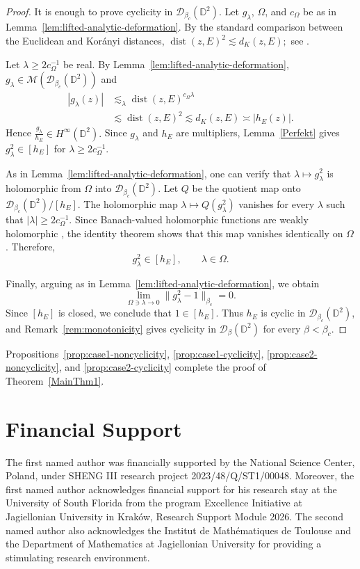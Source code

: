 \documentclass[a4paper,12pt]{amsart}
\theoremstyle{definition}
\begin{document}
\begin{proof}
It is enough to prove cyclicity in $\mathcal D_{\beta_c}(\mathbb D^2)$. Let
$g_\lambda$, $\Omega$, and $c_\Omega$ be as in
Lemma~\ref{lem:lifted-analytic-deformation}. By the standard comparison
between the Euclidean and Korányi distances,
$
    \operatorname{dist}(z,E)^2\lesssim d_K(z,E);
$
see \cite[p.~540]{Bruna1986}.

Let $\lambda\geq2c_\Omega^{-1}$ be real. By
Lemma~\ref{lem:lifted-analytic-deformation},
$
    g_\lambda\in\mathcal M(\mathcal D_{\beta_c}(\mathbb D^2))
$
and
\[
\begin{aligned}
    |g_\lambda(z)|
    &\lesssim_\lambda
    \operatorname{dist}(z,E)^{c_\Omega\lambda}\\
    &\lesssim
    \operatorname{dist}(z,E)^2
    \lesssim d_K(z,E)
    \asymp |h_E(z)|.
\end{aligned}
\]
Hence
$
    \frac{g_\lambda}{h_E}\in H^\infty(\mathbb D^2).
$
Since $g_\lambda$ and $h_E$ are multipliers,
Lemma~\ref{Perfekt} gives
$
    g_\lambda^2\in[h_E]$ for
    $ \lambda\geq2c_\Omega^{-1}.
$

As in Lemma~\ref{lem:lifted-analytic-deformation}, one can verify that $\lambda\longmapsto g_\lambda^2$ is holomorphic from $\Omega$ into $\mathcal D_{\beta_c}(\mathbb D^2)$. Let
$Q$ be the quotient map onto
$\mathcal D_{\beta_c}(\mathbb D^2)/[h_E]$. The holomorphic map
$
    \lambda\longmapsto Q(g_\lambda^2)
$
vanishes for every $\lambda$ such that $|\lambda|\geq2c_\Omega^{-1}$. Since
Banach-valued holomorphic functions are weakly holomorphic
\cite[Definition~3.30, p.~82]{Rudin1991}, the identity theorem
shows that this map vanishes identically on $\Omega$. Therefore,
\[
    g_\lambda^2\in[h_E],
    \qquad \lambda\in\Omega.
\]

Finally, arguing as in Lemma~\ref{lem:lifted-analytic-deformation}, we obtain
\[
    \lim_{\Omega\ni\lambda\to0}
    \|g_\lambda^2-1\|_{\beta_c}
    =0.
\]
Since $[h_E]$ is closed, we conclude that $1\in[h_E]$. Thus $h_E$ is cyclic in $\mathcal D_{\beta_c}(\mathbb D^2)$, and
Remark~\ref{rem:monotonicity} gives cyclicity in
$\mathcal D_\beta(\mathbb D^2)$ for every $\beta<\beta_c$.
\end{proof}

Propositions~\ref{prop:case1-noncyclicity},
\ref{prop:case1-cyclicity}, \ref{prop:case2-noncyclicity}, and
\ref{prop:case2-cyclicity} complete the proof of
Theorem~\ref{MainThm1}.

\section{Financial Support} The first named author was financially supported by the National
Science Center, Poland, under SHENG III research project 2023/48/Q/ST1/00048. Moreover, the first named author acknowledges financial support for his research stay at the University of South Florida from the program Excellence
Initiative at Jagiellonian University in Krak\'ow, Research Support Module 2026. The second named author also acknowledges the Institut de Mathématiques de Toulouse and the Department of Mathematics at Jagiellonian University for providing a stimulating research environment.
\end{document}

